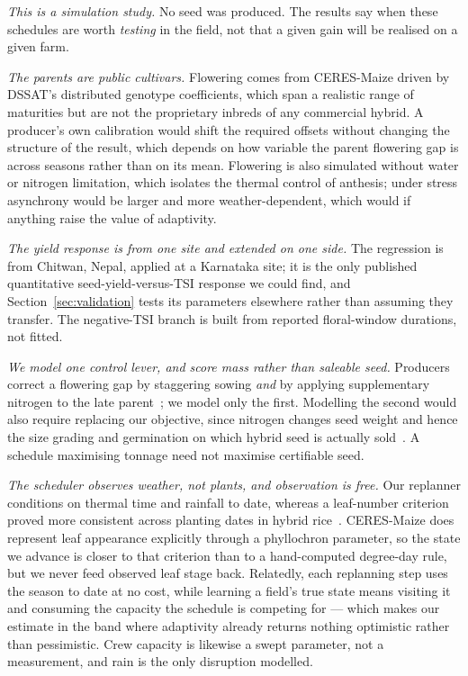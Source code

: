 \documentclass[10pt,twocolumn]{article}
\begin{document}
\emph{This is a simulation study.} No seed was produced. The results say
when these schedules are worth \emph{testing} in the field, not that a given
gain will be realised on a given farm.

\emph{The parents are public cultivars.} Flowering comes from CERES-Maize
driven by DSSAT's distributed genotype coefficients, which span a realistic
range of maturities but are not the proprietary inbreds of any commercial
hybrid. A producer's own calibration would shift the required offsets without
changing the structure of the result, which depends on how variable the
parent flowering gap is across seasons rather than on its mean. Flowering is
also simulated without water or nitrogen limitation, which isolates the
thermal control of anthesis; under stress asynchrony would be larger and more
weather-dependent, which would if anything raise the value of adaptivity.

\emph{The yield response is from one site and extended on one side.} The
regression is from Chitwan, Nepal, applied at a Karnataka site; it is the
only published quantitative seed-yield-versus-TSI response we could find, and
Section~\ref{sec:validation} tests its parameters elsewhere rather than
assuming they transfer. The negative-TSI branch is built from reported
floral-window durations, not fitted.

\emph{We model one control lever, and score mass rather than saleable seed.}
Producers correct a flowering gap by staggering sowing \emph{and} by applying
supplementary nitrogen to the late parent~\cite{priyanka2017,patil2026,%
asefa2024}; we model only the first. Modelling the second would also require
replacing our objective, since nitrogen changes seed weight and hence the
size grading and germination on which hybrid seed is actually
sold~\cite{marahatta2025}. A schedule maximising tonnage need not maximise
certifiable seed.

\emph{The scheduler observes weather, not plants, and observation is free.}
Our replanner conditions on thermal time and rainfall to date, whereas a
leaf-number criterion proved more consistent across planting dates in hybrid
rice~\cite{varma2018}. CERES-Maize does represent leaf appearance explicitly
through a phyllochron parameter, so the state we advance is closer to that
criterion than to a hand-computed degree-day rule, but we never feed observed
leaf stage back. Relatedly, each replanning step uses the season to date at
no cost, while learning a field's true state means visiting it and consuming
the capacity the schedule is competing for --- which makes our estimate in
the band where adaptivity already returns nothing optimistic rather than
pessimistic. Crew capacity is likewise a swept parameter, not a measurement,
and rain is the only disruption modelled.
\end{document}
